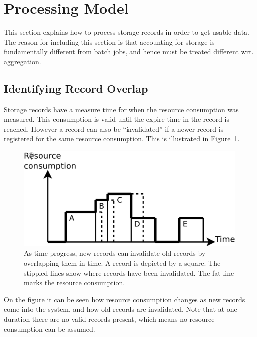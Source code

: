 \section{Processing Model}

This section explains how to process storage records in order to get usable
data. The reason for including this section is that accounting for storage is
fundamentally different from batch jobs, and hence must be treated different
wrt. aggregation.

\subsection{Identifying Record Overlap}

Storage records have a measure time for when the resource consumption was
measured. This consumption is valid until the expire time in the record is
reached. However a record can also be ``invalidated'' if a newer record is
registered for the same resource consumption. This is illustrated in
Figure~\ref{fig:consumptionprogress}.

\begin{figure}[htb]
  \begin{center}
    \includegraphics[width=12cm]{figures/consumptionprogress}
    \caption{As time progress, new records can invalidate old records by
    overlapping them in time. A record is depicted by a square. The stippled
    lines show where records have been invalidated. The fat line marks the
    resource consumption.}
    \label{fig:consumptionprogress}
  \end{center}
\end{figure}

On the figure it can be seen how resource consumption changes as new records
come into the system, and how old records are invalidated. Note that at one
duration there are no valid records present, which means no resource
consumption can be assumed.

